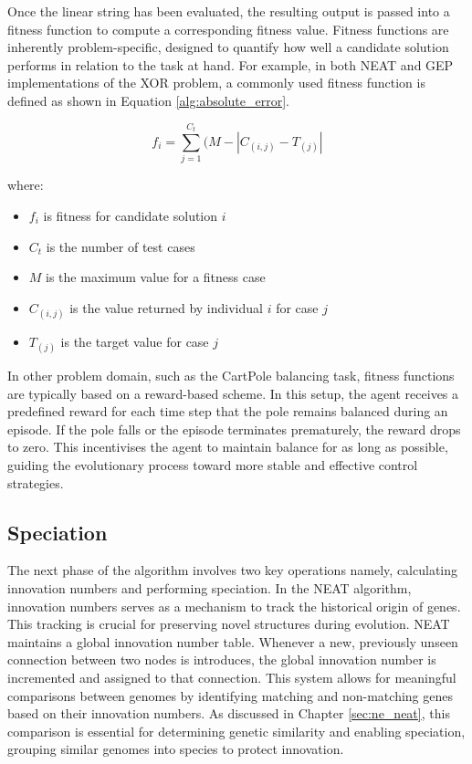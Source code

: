 \parbreak\noindent Once the linear string has been evaluated, the resulting output is passed into a fitness function to compute a corresponding fitness value. Fitness functions are inherently problem-specific, designed to quantify how well a candidate solution performs in relation to the task at hand. For example, in both NEAT and GEP implementations of the XOR problem, a commonly used fitness function is defined as shown in Equation \ref{alg:absolute_error}.
\begin{ceqn}
	\begin{equation}\label{alg:absolute_error}
		f_{i} = \sum_{j=1}^{C_t}(M-|C_{(i,j)}-T_{(j)}|
	\end{equation}
\end{ceqn}

\noindent where:
\begin{itemize}
    \item $f_i$ is fitness for candidate solution $i$
    \item $C_t$ is the number of test cases
    \item $M$ is the maximum value for a fitness case
    \item $C_{(i,j)}$ is the value returned by individual $i$ for case $j$
    \item $T_{(j)}$ is the target value for case $j$
\end{itemize}

\parbreak\noindent In other problem domain, such as the CartPole balancing task, fitness functions are typically based on a reward-based scheme. In this setup, the agent receives a predefined reward for each time step that the pole remains balanced during an episode. If the pole falls or the episode terminates prematurely, the reward drops to zero. This incentivises the agent to maintain balance for as long as possible, guiding the evolutionary process toward more stable and effective control strategies.

\subsection{Speciation}
The next phase of the algorithm involves two key operations namely, calculating innovation numbers and performing speciation. In the NEAT algorithm, innovation numbers serves as a mechanism to track the historical origin of genes. This tracking is crucial for preserving novel structures during evolution. NEAT maintains a global innovation number table. Whenever a new, previously unseen connection between two nodes is introduces, the global innovation number is incremented and assigned to that connection. This system allows for meaningful comparisons between genomes by identifying matching and non-matching genes based on their innovation numbers. As discussed in Chapter \ref{sec:ne_neat}, this comparison is essential for determining genetic similarity and enabling speciation, grouping similar genomes into species to protect innovation.

